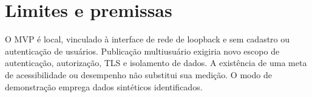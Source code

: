 \documentclass[12pt,a4paper]{article}
\begin{document}
\section{Limites e premissas}
O MVP é local, vinculado à interface de rede de loopback e sem cadastro ou autenticação de
usuários. Publicação multiusuário exigiria novo escopo de autenticação, autorização, TLS e
isolamento de dados. A existência de uma meta de acessibilidade ou desempenho não substitui
sua medição. O modo de demonstração emprega dados sintéticos identificados.
\end{document}
